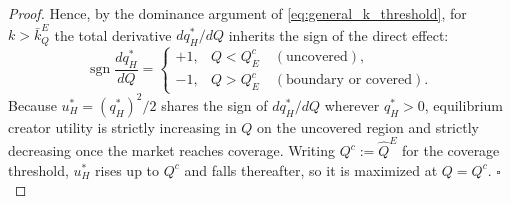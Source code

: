 \begin{proof}
Hence, by the dominance argument of \eqref{eq:general_k_threshold}, for $k>\bar k_Q^E$ the
total derivative $dq_H^*/dQ$ inherits the sign of the direct effect:
\[
    \operatorname{sgn}\frac{dq_H^*}{dQ}
    =\begin{cases}
        +1, & Q< Q^{c}_E\quad(\text{uncovered}),\\[4pt]
        -1, & Q> Q^{c}_E\quad(\text{boundary or covered}).
    \end{cases}
\]
Because $u_H^*=(q_H^*)^2/2$ shares the sign of $dq_H^*/dQ$ wherever $q_H^*>0$,
equilibrium creator utility is strictly increasing in $Q$ on the uncovered region
and strictly decreasing once the market reaches coverage. Writing $Q^{c}:=\hat
Q^{E}$ for the coverage threshold, $u_H^*$ rises up to $Q^{c}$ and falls
thereafter, so it is maximized at $Q=Q^{c}$. 
\hfill$\square$
\end{proof}




